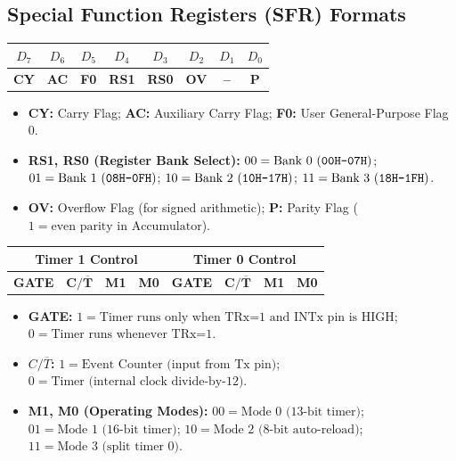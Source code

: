 \documentclass[12pt,a4paper]{article}
\begin{document}
\subsection{Special Function Registers (SFR) Formats}
\begin{tcolorbox}[formulabox, title={Program Status Word (PSW, Address \texttt{D0H})}]
\centering
\begin{tabular}{|c|c|c|c|c|c|c|c|}
\hline
\textbf{$D_7$} & \textbf{$D_6$} & \textbf{$D_5$} & \textbf{$D_4$} & \textbf{$D_3$} & \textbf{$D_2$} & \textbf{$D_1$} & \textbf{$D_0$} \\ \hline
\textbf{CY} & \textbf{AC} & \textbf{F0} & \textbf{RS1} & \textbf{RS0} & \textbf{OV} & \textbf{--} & \textbf{P} \\ \hline
\end{tabular}
\par\vspace{4pt}\raggedright
\begin{itemize}[leftmargin=*, itemsep=2pt]
  \item \textbf{CY:} Carry Flag; \textbf{AC:} Auxiliary Carry Flag; \textbf{F0:} User General-Purpose Flag 0.
  \item \textbf{RS1, RS0 (Register Bank Select):} $00 = \text{Bank 0 (\texttt{00H-07H})}$; $01 = \text{Bank 1 (\texttt{08H-0FH})}$; $10 = \text{Bank 2 (\texttt{10H-17H})}$; $11 = \text{Bank 3 (\texttt{18H-1FH})}$.
  \item \textbf{OV:} Overflow Flag (for signed arithmetic); \textbf{P:} Parity Flag ($1 = \text{even parity in Accumulator}$).
\end{itemize}
\end{tcolorbox}

\begin{tcolorbox}[formulabox, title={Timer Mode Register (TMOD, Address \texttt{89H})}]
\centering
\begin{tabular}{|c|c|c|c|c|c|c|c|}
\hline
\multicolumn{4}{|c|}{\textbf{Timer 1 Control}} & \multicolumn{4}{c|}{\textbf{Timer 0 Control}} \\ \hline
\textbf{GATE} & $\mathbf{C/\overline{T}}$ & \textbf{M1} & \textbf{M0} & \textbf{GATE} & $\mathbf{C/\overline{T}}$ & \textbf{M1} & \textbf{M0} \\ \hline
\end{tabular}
\par\vspace{3pt}\raggedright
\begin{itemize}[leftmargin=*, itemsep=1.5pt]
  \item \textbf{GATE:} $1 = \text{Timer runs only when TRx=1 and INTx pin is HIGH}$; $0 = \text{Timer runs whenever TRx=1}$.
  \item \textbf{$C/\overline{T}$:} $1 = \text{Event Counter (input from Tx pin)}$; $0 = \text{Timer (internal clock divide-by-12)}$.
  \item \textbf{M1, M0 (Operating Modes):} $00 = \text{Mode 0 (13-bit timer)}$; $01 = \text{Mode 1 (16-bit timer)}$; $10 = \text{Mode 2 (8-bit auto-reload)}$; $11 = \text{Mode 3 (split timer 0)}$.
\end{itemize}
\end{tcolorbox}
\end{document}
